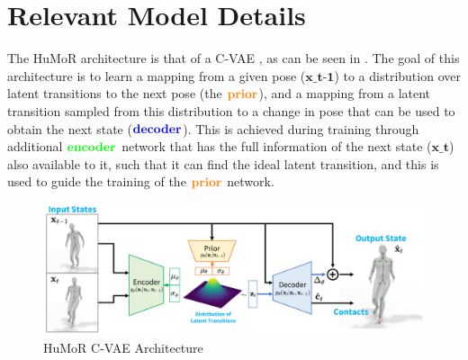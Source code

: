 \section{Relevant Model Details}

The HuMoR architecture is that of a C-VAE \cite{CVAE}, as can be seen in . The goal of this architecture is to learn a mapping from a given pose ($\textbf{x_{t-1}}$) to a distribution over latent transitions to the next pose  (the $\textbf{\textcolor{orange}{prior}}$), and a mapping from a latent transition sampled from this distribution to a change in pose that can be used to obtain the next state ($\textbf{\textcolor{blue}{decoder}}$). This is achieved during training through additional $\textbf{\textcolor{green}{encoder}}$ network that has the full information of the next state ($\textbf{x_t}$) also available to it, such that it can find the ideal latent transition, and this is used to guide the training of the $\textbf{\textcolor{orange}{prior}}$ network.

\begin{figure}[!ht]
    \centering
    \includegraphics[width=1\textwidth]{Figures/humor/model/architecture.png}
    \caption{HuMoR C-VAE Architecture}
    \label{fig:humor_architecture}
\end{figure}


